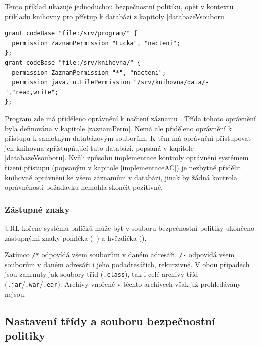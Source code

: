 Tento příklad ukazuje jednoduchou bezpečnostní politiku, opět v kontextu příkladu knihovny pro přístup k databázi z kapitoly \ref{databazeVsouboru}.

\begin{lstlisting}[caption=Příklad souboru bezpečnostní politiky, label=prikladSouboruBP]
grant codeBase "file:/srv/program/" {
  permission ZaznamPermission "Lucka", "nacteni";
};
grant codeBase "file:/srv/knihovna/" {
  permission ZaznamPermission "*", "nacteni";
  permission java.io.FilePermission "/srv/knihovna/data/-","read,write";
};
\end{lstlisting}

Program zde má přiděleno oprávnění k načtení záznamu . Třída tohoto oprávnění byla definována v kapitole \ref{zaznamPerm}.
Nemá ale přiděleno oprávnění k přístupu k samotným databázovým souborům.
K těm má oprávnění přistupovat jen knihovna zpřístupňující tuto databázi, popsaná v kapitole \ref{databazeVsouboru}.
Kvůli způsobu implementace kontroly oprávnění systémem řízení přístupu (popsaným v kapitole \ref{implementaceAC}) je nezbytné přidělit knihovně oprávnění ke všem záznamům v databázi, jinak by žádná kontrola oprávněnosti požadavku nemohla skončit pozitivně.

\subsubsection{Zástupné znaky}

URL kořene systému balíčků může být v souboru bezpečnostní politiky ukončeno zástupnými znaky pomlčka ({\tt -}) a hvězdička ({\tt *}).

Zatímco {\tt /*} odpovídá všem souborům v daném adresáři, {\tt /-} odpovídá všem souborům v daném adresáři i jeho podadresářích, rekurzivně.
V obou případech jsou zahrnuty jak soubory tříd ({\tt .class}), tak i celé archivy tříd ({\tt .jar}/{\tt .war}/{\tt .ear}).
Archivy vnořené v těchto archivech však již prohledávány nejsou.
\cite{jdkdocPolicyFiles}

\subsection{Nastavení třídy a souboru bezpečnostní politiky} \label{nastaveniPolitiky}

